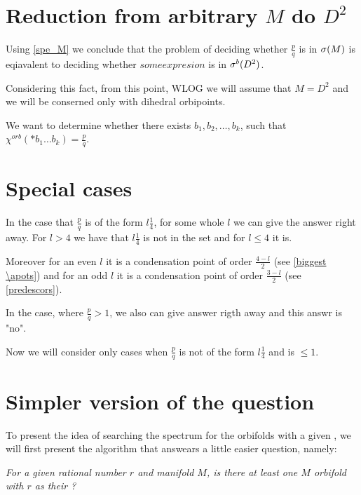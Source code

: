 \section{Reduction from arbitrary $M$ do $D^2$}
Using \ref{spe_M} we conclude that the problem of deciding whether $\frac{p}{q}$ is in ${\sigma}(M)$
is eqiavalent to deciding whether $some expresion$ is in ${\sigma^b(D^2)}$. 

Considering this fact, from this point, WLOG we will assume that $M = D^2$ and we will 
be conserned only with dihedral orbipoints.

We want to determine whether there exists $b_1,b_2,\dots,b_k$, such that $\chi^{orb}(*b_1\dots b_k) 
= 
\frac{p}{q}$. 

\section{Special cases}
In the case that $\frac{p}{q}$ is of the form $l\frac{1}{4}$, for some whole $l$ 
we can give the answer right away. For $l > 4$ we have that $l\frac{1}{4}$ is not in the set 
and for $l \leq 4$ it is. 

Moreover for an even $l$ it is a condensation point of order 
$\frac{4-l}{2}$ (see \ref{biggest \apots})
and for an odd $l$ it is a condensation point of order $\frac{3-l}{2}$ (see \ref{predescors}). 

In the case, where $\frac{p}{q} > 1$, we also can give answer rigth away and this answr is "no". 

Now we will consider only cases when $\frac{p}{q}$ is not of the form $l\frac{1}{4}$ and is 
$\leq 1$.

\section{Simpler version of the question}

To present the idea of searching the spectrum for the orbifolds with a given \Eoc, we will 
first present the algorithm that answears a little easier question, namely: 

\textit{For a given rational number $r$ and manifold $M$, is there at least one 
$M$ orbifold with $r$ as their \Eoc?}

